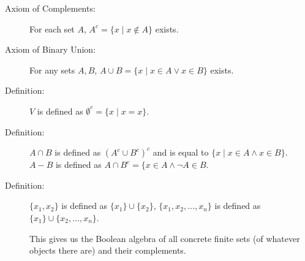 \documentclass{slides}
\begin{document}
\begin{slide}

\begin{description}


\item[Axiom of Complements:]  For each set $A$, $A^c = \{x\mid x \not\in A\}$ exists.

\item[Axiom of Binary Union:]  For any sets $A,B$, $A \cup B = \{x \mid x \in A \vee x \in B\}$ exists.

\item[Definition:]  $V$ is defined as $\emptyset^c = \{x\mid x = x\}$.

\item[Definition:]  $A \cap B$ is defined as $(A^c \cup B^c)^c$ and is equal to $\{x\mid x \in A \wedge x \in B\}$.
$A-B$ is defined as $A \cap B^c = \{x \in A \wedge\neg A \in B$.

\item[Definition:]  $\{x_1,x_2\}$ is defined as $\{x_1\} \cup \{x_2\}$,  $\{x_1,x_2,\ldots,x_n\}$ is defined
as $\{x_1\} \cup \{x_2,\ldots,x_n\}$.

This gives us the Boolean algebra of all concrete finite sets (of whatever objects there are) and their complements.

\end{description}

\end{slide}
\end{document}
